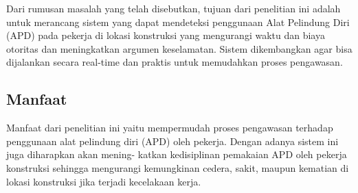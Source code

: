 Dari rumusan masalah yang telah disebutkan, tujuan dari penelitian ini adalah untuk merancang sistem yang dapat mendeteksi penggunaan Alat Pelindung Diri (APD) pada pekerja di lokasi konstruksi yang mengurangi waktu dan biaya otoritas dan meningkatkan argumen keselamatan. Sistem dikembangkan agar bisa dijalankan secara real-time dan praktis untuk memudahkan proses pengawasan.
\subsection{Manfaat}

Manfaat dari penelitian ini yaitu mempermudah proses pengawasan terhadap penggunaan alat pelindung diri (APD) oleh pekerja. Dengan adanya sistem ini juga diharapkan akan mening- katkan kedisiplinan pemakaian APD oleh pekerja konstruksi sehingga mengurangi kemungkinan cedera, sakit, maupun kematian di lokasi konstruksi jika terjadi kecelakaan kerja.